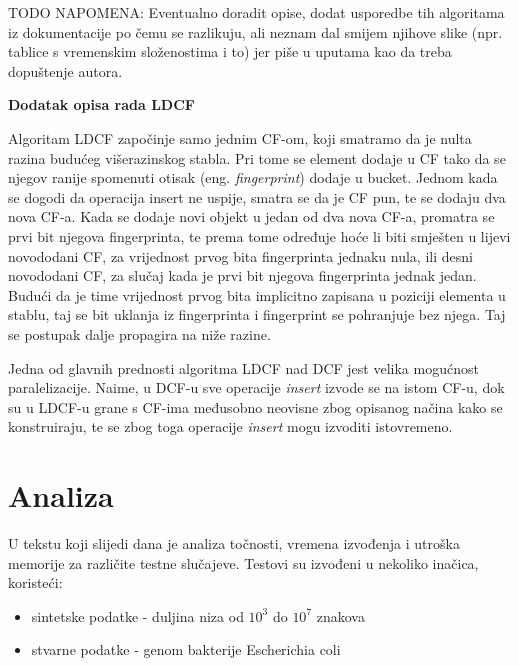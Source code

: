 \documentclass[times, utf8, seminar, numeric]{fer}
\begin{document}
TODO NAPOMENA: Eventualno doradit opise, dodat usporedbe tih algoritama iz dokumentacije po čemu se razlikuju, ali neznam dal smijem njihove slike (npr. tablice s vremenskim složenostima i to) jer piše u uputama kao da treba dopuštenje autora. 



\begin{flushleft}
\textbf{Dodatak opisa rada LDCF}
\end{flushleft}



Algoritam LDCF započinje samo jednim CF-om, koji smatramo da je nulta razina budućeg višerazinskog stabla. Pri tome se element dodaje u CF tako da se njegov ranije spomenuti otisak (eng. \textit{fingerprint}) dodaje u bucket. Jednom kada se dogodi da operacija insert ne uspije, smatra se da je CF pun, te se dodaju dva nova CF-a. Kada se dodaje novi objekt u jedan od dva nova CF-a, promatra se prvi bit njegova fingerprinta, te prema tome određuje hoće li biti smješten u lijevi novododani CF, za vrijednost prvog bita fingerprinta jednaku nula, ili desni novododani CF, za slučaj kada je prvi bit njegova fingerprinta jednak jedan. Budući da je time vrijednost prvog bita implicitno zapisana u poziciji elementa u stablu, taj se bit uklanja iz fingerprinta i fingerprint se pohranjuje bez njega. Taj se postupak dalje propagira na niže razine.

Jedna od glavnih prednosti algoritma LDCF nad DCF jest velika mogućnost paralelizacije. Naime, u DCF-u sve operacije \textit{insert} izvode se na istom CF-u, dok su u LDCF-u grane s CF-ima međusobno neovisne zbog opisanog načina kako se konstruiraju, te se zbog toga operacije \textit{insert} mogu izvoditi istovremeno.
 
\chapter{Analiza}
\label{Analiza}

U tekstu koji slijedi dana je analiza točnosti, vremena izvođenja i utroška memorije za različite testne slučajeve. Testovi su izvođeni u nekoliko inačica, koristeći:
\begin{itemize}

  \item {sintetske podatke - duljina niza od $10^3$ do $10^7$ znakova}
  \item {stvarne podatke - genom bakterije Escherichia coli}

\end{itemize}
\end{document}
